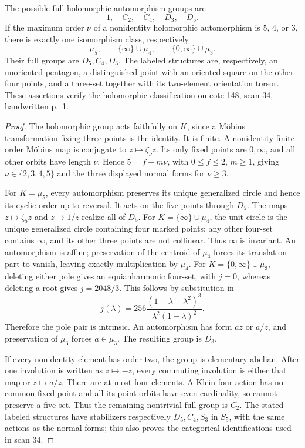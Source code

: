 The possible full holomorphic automorphism groups are
\[
 1,\quad C_2,\quad C_4,\quad D_3,\quad D_5.
\]
If the maximum order $\nu$ of a nonidentity holomorphic automorphism
is $5$, $4$, or $3$, there is exactly one isomorphism class, respectively
\[
 \mu_5,\qquad\{\infty\}\cup\mu_4,
 \qquad\{0,\infty\}\cup\mu_3.
\]
Their full groups are $D_5,C_4,D_3$.  The labeled structures are,
respectively, an unoriented pentagon, a distinguished point with an
oriented square on the other four points, and a three-set together
with its two-element orientation torsor.  These assertions verify
the holomorphic classification on cote 148, scan 34, handwritten p.~1.
\begin{proof}
The holomorphic group acts faithfully on $K$, since a M\"obius
transformation fixing three points is the identity.  It is finite.
A nonidentity finite-order M\"obius map is conjugate to
$z\mapsto\zeta_\nu z$.  Its only fixed points are $0,\infty$, and
all other orbits have length $\nu$.  Hence
$5=f+m\nu$, with $0\leq f\leq2$, $m\geq1$, giving
$\nu\in\{2,3,4,5\}$ and the three displayed normal forms for
$\nu\geq3$.

For $K=\mu_5$, every automorphism preserves its unique generalized
circle and hence its cyclic order up to reversal.  It acts on the
five points through $D_5$.  The maps $z\mapsto\zeta_5z$ and
$z\mapsto1/z$ realize all of $D_5$.
For $K=\{\infty\}\cup\mu_4$, the unit circle is the unique
generalized circle containing four marked points: any other
four-set contains $\infty$, and its other three points are not
collinear.  Thus $\infty$ is invariant.  An automorphism is affine;
preservation of the centroid of $\mu_4$ forces its translation
part to vanish, leaving exactly multiplication by $\mu_4$.
For $K=\{0,\infty\}\cup\mu_3$, deleting either pole gives an
equianharmonic four-set, with $j=0$, whereas deleting a root gives
$j=2048/3$.  This follows by substitution in
\[
 j(\lambda)=256\frac{(1-\lambda+\lambda^2)^3}
 {\lambda^2(1-\lambda)^2}.
\]
Therefore the pole pair is intrinsic.  An automorphism has form
$az$ or $a/z$, and preservation of $\mu_3$ forces $a\in\mu_3$.
The resulting group is $D_3$.

If every nonidentity element has order two, the group is elementary
abelian.  After one involution is written as $z\mapsto-z$, every
commuting involution is either that map or $z\mapsto a/z$.
There are at most four elements.  A Klein four action has no common
fixed point and all its point orbits have even cardinality, so cannot
preserve a five-set.  Thus the remaining nontrivial full group is
$C_2$.  The stated labeled structures have stabilizers respectively
$D_5,C_4,S_3$ in $S_5$, with the same actions as the normal forms;
this also proves the categorical identifications used in scan 34.
\end{proof}

